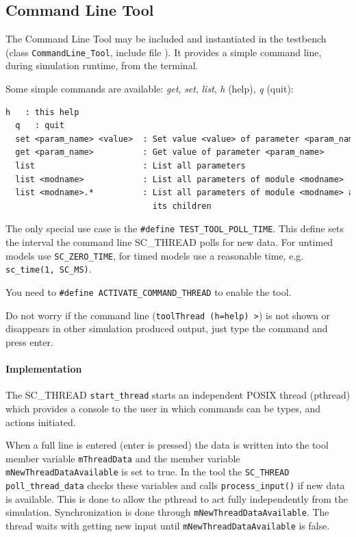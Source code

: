 \subsection{Command Line Tool}
\label{CommandLineTool}

The Command Line Tool may be included and instantiated in the testbench (class \mbox{\lstinline|CommandLine_Tool|,} include file ). It provides a simple command line, during simulation runtime, from the terminal.

\noindent
\begin{minipage}{\textwidth}
Some simple commands are available: \emph{get}, \emph{set}, \emph{list}, \emph{h} (help), \emph{q} (quit):
\begin{lstlisting}[language=TeX]
  h   : this help
  q   : quit
  set <param_name> <value>  : Set value <value> of parameter <param_name>
  get <param_name>          : Get value of parameter <param_name>
  list                      : List all parameters
  list <modname>            : List all parameters of module <modname>
  list <modname>.*          : List all parameters of module <modname> and
                              its children
\end{lstlisting}
\end{minipage}

The only special use case is the \lstinline|#define TEST_TOOL_POLL_TIME|. This define sets the interval the
command line SC\_THREAD polls for new data. For untimed models use \lstinline|SC_ZERO_TIME|, for
timed models use a reasonable time, e.g. \lstinline|sc_time(1, SC_MS)|.

You need to \lstinline|#define ACTIVATE_COMMAND_THREAD| to enable the tool.

Do not worry if the command line (\lstinline|toolThread (h=help) >|) is not shown or disappears in
other simulation produced output, just type the command and press enter.

\paragraph{Implementation}
The SC\_THREAD \lstinline|start_thread| starts an independent POSIX thread (pthread) which provides
a console to the user in which commands can be types, and actions initiated.

When a full line is entered (enter is pressed) the data is written into the tool member variable \lstinline|mThreadData| and the member variable
\lstinline|mNewThreadDataAvailable| is set to true. In the tool the \lstinline|SC_THREAD poll_thread_data| checks these variables and calls
\lstinline|process_input()| if new data is available. This is done to allow the pthread to act fully independently from the simulation. Synchronization is done through \lstinline|mNewThreadDataAvailable|. The thread waits with getting new input until \lstinline|mNewThreadDataAvailable| is false.


